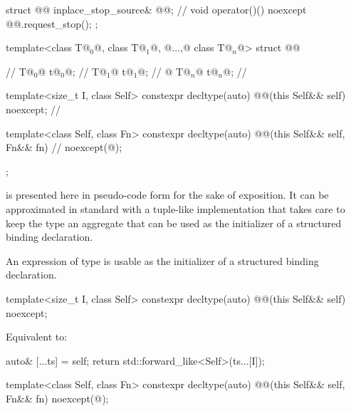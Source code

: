 \pnum
\begin{codeblock}
struct @@ {
  inplace_stop_source& @@;       // \expos
  void operator()() noexcept { @@.request_stop(); }
};
\end{codeblock}

\pnum
\begin{codeblock}
template<class T@$_0$@, class T@$_1$@, @$\dotsc$,@ class T@$_n$@>
struct @@ {       // \expos
  T@$_0$@ t@$_0$@;                // \expos
  T@$_1$@ t@$_1$@;                // \expos
    @\vdots@
  T@$_n$@ t@$_n$@;                // \expos

  template<size_t I, class Self>
  constexpr decltype(auto) @@(this Self&& self) noexcept;      // \expos

  template<class Self, class Fn>
  constexpr decltype(auto) @@(this Self&& self, Fn&& fn)     // \expos
    noexcept(@\seebelow@);
};
\end{codeblock}

\pnum
\begin{note}
 is presented here in pseudo-code form
for the sake of exposition.
It can be approximated in standard \Cpp{} with a tuple-like implementation
that takes care to keep the type an aggregate
that can be used as the initializer of a structured binding declaration.
\end{note}
\begin{note}
An expression of type  is usable as
the initializer of a structured binding declaration.
\end{note}

\begin{itemdecl}
template<size_t I, class Self>
constexpr decltype(auto) @@(this Self&& self) noexcept;
\end{itemdecl}

\begin{itemdescr}
\pnum
\effects
Equivalent to:
\begin{codeblock}
auto& [...ts] = self;
return std::forward_like<Self>(ts...[I]);
\end{codeblock}
\end{itemdescr}

\begin{codeblock}
template<class Self, class Fn>
constexpr decltype(auto) @@(this Self&& self, Fn&& fn) noexcept(@\seebelow@);
\end{codeblock}

